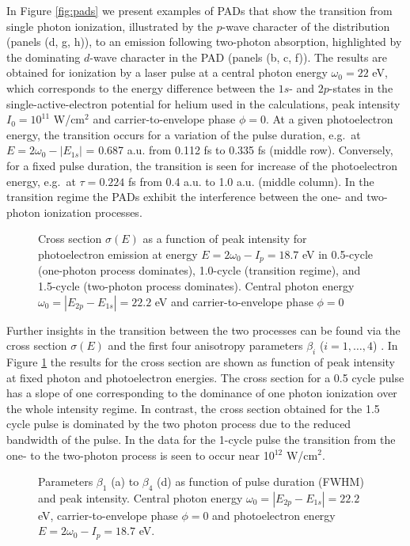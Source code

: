 In Figure \ref{fig:pads} we present examples of PADs that show the transition from single photon ionization, illustrated by the $p$-wave character of the distribution (panels (d, g, h)), to an emission following two-photon absorption, highlighted by the dominating $d$-wave character in the PAD (panels (b, c, f)). The results are obtained for ionization by a laser pulse at a central photon energy $\omega_0 = 22$ eV, which corresponds to the energy difference between the $1s$- and $2p$-states in the single-active-electron potential for helium used in the calculations, peak intensity $I_0 = 10^{11}$ W/cm$^2$ and carrier-to-envelope phase $\phi = 0$. At a given photoelectron energy, the transition occurs for a variation of the pulse duration, e.g.\ at $E = 2\omega_0 - |E_{1s}|$ = 0.687 a.u. from 0.112 fs to 0.335 fs (middle row). Conversely, for a fixed pulse duration, the transition is seen for increase of the photoelectron energy, e.g.\ at $\tau = 0.224$ fs from 0.4 a.u. to 1.0 a.u. (middle column). In the transition regime the PADs exhibit the interference between the one- and two-photon ionization processes. 

\begin{figure}[t]
\centering
\caption{Cross section $\sigma(E)$ as a function of peak intensity for photoelectron emission at energy $E = 2\omega_0 - I_p = 18.7$ eV in 0.5-cycle (one-photon process dominates), 1.0-cycle (transition regime), and 1.5-cycle (two-photon process dominates). Central photon energy $\omega_0 = |E_{2p} - E_{1s}| = 22.2$ eV and carrier-to-envelope phase $\phi=0$
} 
  \label{fig:cross}
\end{figure}

Further insights in the transition between the two processes can be found via the cross section $\sigma(E)$
and the first four anisotropy parameters $\beta_i$ ($i = 1, \ldots, 4$) . In Figure \ref{fig:cross} the results for the cross section are shown as function of peak intensity at fixed photon and photoelectron energies. The cross section for a 0.5 cycle pulse has a slope of one corresponding to the dominance of one photon ionization over the whole intensity regime. In contrast, the cross section obtained for the 1.5 cycle pulse is dominated by the two photon process due to the reduced bandwidth of the pulse. In the data for the 1-cycle pulse the transition from the one- to the two-photon process is seen to occur near 10$^{12}$ W/cm$^2$. 

\begin{figure}[t]
\centering
\caption{
Parameters $\beta_1$ (a) to $\beta_4$ (d) as function of pulse duration (FWHM) and peak intensity. Central photon energy $\omega_0 = |E_{2p} - E_{1s}| = 22.2$ eV, carrier-to-envelope phase $\phi=0$ and photoelectron energy $E = 2\omega_0 - I_p = 18.7$ eV.
} 
  \label{fig:beta}
\end{figure}

